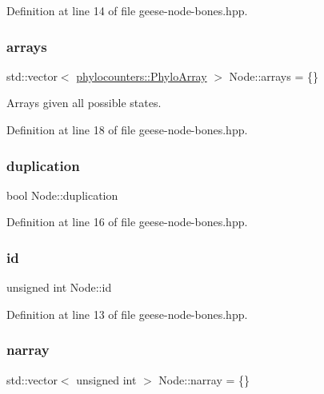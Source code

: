Definition at line 14 of file geese-\/node-\/bones.\+hpp.

\mbox{\label{class_node_a269d78db10090d106c697d7c73bac9c7}} 
\subsubsection{\texorpdfstring{arrays}{arrays}}
{\footnotesize\ttfamily std\+::vector$<$ \hyperlink{namespacebarry_1_1counters_1_1phylo_abd293bf65e494e903639fb5fb2c91604}{phylocounters\+::\+Phylo\+Array} $>$ Node\+::arrays = \{\}}



Arrays given all possible states. 



Definition at line 18 of file geese-\/node-\/bones.\+hpp.

\mbox{\label{class_node_a3129939e8a58c055cb5ad8db8be6b10a}} 
\subsubsection{\texorpdfstring{duplication}{duplication}}
{\footnotesize\ttfamily bool Node\+::duplication}



Definition at line 16 of file geese-\/node-\/bones.\+hpp.

\mbox{\label{class_node_adb90577d9d796c4ccbccf41ce2efc6c9}} 
\subsubsection{\texorpdfstring{id}{id}}
{\footnotesize\ttfamily unsigned int Node\+::id}



Definition at line 13 of file geese-\/node-\/bones.\+hpp.

\mbox{\label{class_node_a9abaf3f1f5e9c5e383125946b04a15ac}} 
\subsubsection{\texorpdfstring{narray}{narray}}
{\footnotesize\ttfamily std\+::vector$<$ unsigned int $>$ Node\+::narray = \{\}}



